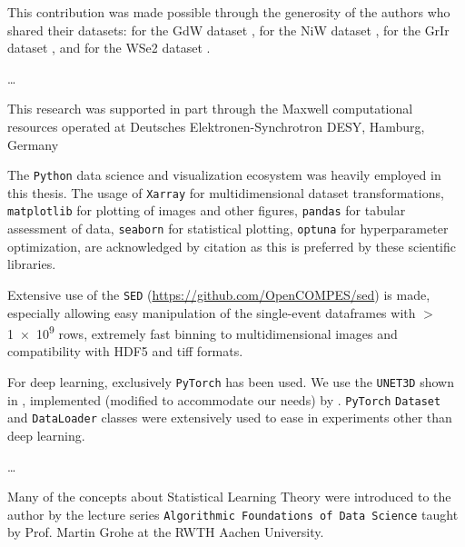
This contribution was made possible through the generosity of the authors who shared their datasets: \citeauthor{kutnyakhovMultidimensionalPhotoemissionSpectra2024} for the \gls{GdW} dataset \cite{kutnyakhovMultidimensionalPhotoemissionSpectra2024}, \citeauthor{shokeenRealtimeObservationNonequilibrium2024} for the \gls{NiW} dataset \cite{shokeenRealtimeObservationNonequilibrium2024}, \citeauthor{heberMultispectralTimeresolvedEnergy2022} for the \gls{GrIr} dataset \cite{heberMultispectralTimeresolvedEnergy2022}, and \citeauthor{maklarTimeresolvedARPESRAW2022} for the \gls{WSe2} dataset \cite{maklarTimeresolvedARPESRAW2022}.

\dots

This research was supported in part through the Maxwell computational resources operated at Deutsches Elektronen-Synchrotron DESY, Hamburg, Germany

The \texttt{Python} data science and visualization ecosystem was heavily employed in this thesis.
The usage of \texttt{Xarray} \cite{hoyerXarrayNDLabeled2017} for multidimensional dataset transformations, \texttt{matplotlib} \cite{hunterMatplotlib2DGraphics2007} for plotting of images and other figures, \texttt{pandas} \cite{thepandasdevelopmentteamPandasdevPandasPandas2024} for tabular assessment of data, \texttt{seaborn} \cite{waskomSeabornStatisticalData2021} for statistical plotting, \texttt{optuna} \cite{akibaOptunaNextgenerationHyperparameter2019} for hyperparameter optimization, are acknowledged by citation as this is preferred by these scientific libraries. 

Extensive use of the \texttt{SED} (\href{https://github.com/OpenCOMPES/sed}{https://github.com/OpenCOMPES/sed}) is made, especially allowing easy manipulation of the single-event dataframes with $>$\num{1e9} rows, extremely fast binning to multidimensional images and compatibility with HDF5 and tiff formats.

For deep learning, exclusively \texttt{PyTorch} \cite{paszkePyTorchImperativeStyle2019} has been used. We use the \texttt{UNET3D} shown in \cite{cicek3DUNetLearning2016}, implemented (modified to accommodate our needs) by \citeauthor{wolnyAccurateVersatile3D2020} \cite{wolnyAccurateVersatile3D2020}. \texttt{PyTorch} \texttt{Dataset} and \texttt{DataLoader} classes were extensively used to ease in experiments other than deep learning.


\dots

Many of the concepts about Statistical Learning Theory were introduced to the author by the lecture series \texttt{Algorithmic Foundations of Data Science} taught by Prof. Martin Grohe at the RWTH Aachen University.
